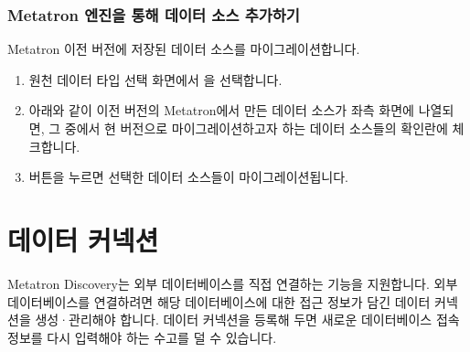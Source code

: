 \documentclass[letterpaper,10pt,english]{sphinxmanual}
\begin{document}
\subsubsection{Metatron 엔진을 통해 데이터 소스 추가하기}
\label{\detokenize{discovery/part02/create_a_data_source:metatron}}\label{\detokenize{discovery/part02/create_a_data_source:create-datasource-from-metatron}}
Metatron 이전 버전에 저장된 데이터 소스를 마이그레이션합니다.
\begin{enumerate}
\def\theenumi{\arabic{enumi}}
\def\labelenumi{\theenumi .}
\makeatletter\def\p@enumii{\p@enumi \theenumi .}\makeatother
\item {} 
원천 데이터 타입 선택 화면에서 을 선택합니다.

\item {} 
아래와 같이 이전 버전의 Metatron에서 만든 데이터 소스가 좌측 화면에 나열되면, 그 중에서 현 버전으로 마이그레이션하고자 하는 데이터 소스들의 확인란에 체크합니다.
\begin{quote}

\begin{figure}[H]
\centering

\noindent{}
\end{figure}
\end{quote}

\item {} 
 버튼을 누르면 선택한 데이터 소스들이 마이그레이션됩니다.
\begin{quote}

\begin{figure}[H]
\centering

\noindent{}
\end{figure}
\end{quote}

\end{enumerate}


\section{데이터 커넥션}
\label{\detokenize{discovery/part02/data_connection:id1}}\label{\detokenize{discovery/part02/data_connection::doc}}
Metatron Discovery는 외부 데이터베이스를 직접 연결하는 기능을 지원합니다. 외부 데이터베이스를 연결하려면 해당 데이터베이스에 대한 접근 정보가 담긴 데이터 커넥션을 생성·관리해야 합니다. 데이터 커넥션을 등록해 두면 새로운 데이터베이스 접속 정보를 다시 입력해야 하는 수고를 덜 수 있습니다.
\end{document}
